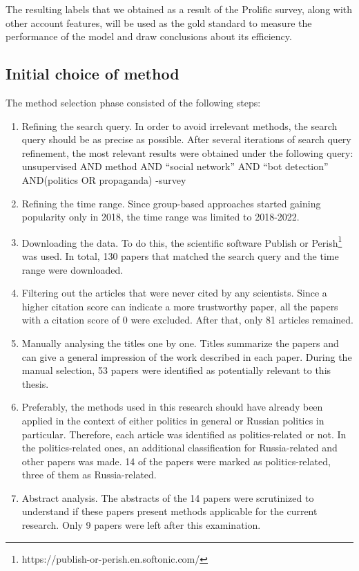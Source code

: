 The resulting labels that we obtained as a result of the Prolific survey, along with other account features, will be used as the gold standard to measure the performance of the model and draw conclusions about its efficiency.

\subsection{Initial choice of method}
The method selection phase consisted of the following steps:
\begin{enumerate}
    \item Refining the search query. In order to avoid irrelevant methods, the search query should be as precise as possible. After several iterations of search query refinement, the most relevant results were obtained under the following query:
           unsupervised AND method AND ``social network''
           AND ``bot detection'' AND(politics OR propaganda)
           -survey
    \item Refining the time range. Since group-based approaches started gaining popularity only in 2018\cite{Cresci2020}, the time range was limited to 2018-2022.
    \item Downloading the data. To do this, the scientific software Publish or Perish\footnote{https://publish-or-perish.en.softonic.com/} was used. In total, 130 papers that matched the search query and the time range were downloaded.
    \item Filtering out the articles that were never cited by any scientists. Since a higher citation score can indicate a more trustworthy paper, all the papers with a citation score of 0 were excluded. After that, only 81 articles remained.
    \item Manually analysing the titles one by one. Titles summarize the papers and can give a general impression of the work described in each paper. During the manual selection, 53 papers were identified as potentially relevant to this thesis.
    \item Preferably, the methods used in this research should have already been applied in the context of either politics in general or Russian politics in particular. Therefore, each article was identified as politics-related or not. In the politics-related ones, an additional classification for Russia-related and other papers was made. 14 of the papers were marked as politics-related, three of them as Russia-related.
    \item Abstract analysis. The abstracts of the 14 papers were scrutinized to understand if these papers present methods applicable for the current research. Only 9 papers were left after this examination.

\end{enumerate}
